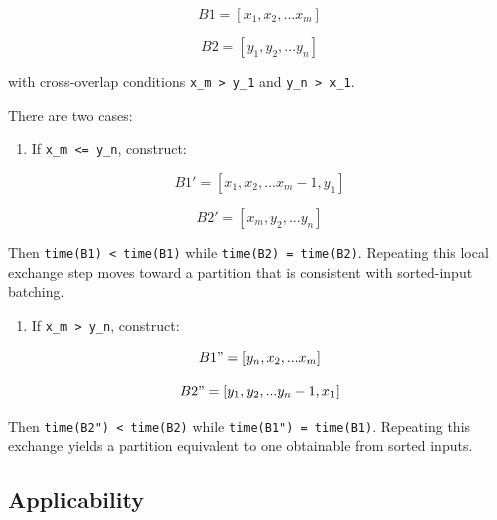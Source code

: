 \documentclass{article}
\providecommand{\tightlist}{\setlength{\itemsep}{0pt}\setlength{\parskip}{0pt}}
\begin{document}
\begin{equation}
B1 = [x_1, x_2, ... x_m]
\end{equation}

\begin{equation}
B2 = [y_1, y_2, ... y_n]
\end{equation}

with cross-overlap conditions \texttt{x\_m\ \textgreater{}\ y\_1} and
\texttt{y\_n\ \textgreater{}\ x\_1}.

There are two cases:

\begin{enumerate}
\def\labelenumi{\arabic{enumi}.}
\tightlist
\item
  If \texttt{x\_m\ \textless{}=\ y\_n}, construct:
\end{enumerate}

\begin{equation}
B1' = [x_1, x_2, ... x_m-1, y_1]
\end{equation}

\begin{equation}
B2' = [x_m, y_2, ... y_n]
\end{equation}

Then \texttt{time(B1\textquotesingle{})\ \textless{}\ time(B1)} while
\texttt{time(B2\textquotesingle{})\ =\ time(B2)}. Repeating this local
exchange step moves toward a partition that is consistent with
sorted-input batching.

\begin{enumerate}
\def\labelenumi{\arabic{enumi}.}
\setcounter{enumi}{1}
\tightlist
\item
  If \texttt{x\_m\ \textgreater{}\ y\_n}, construct:
\end{enumerate}

\begin{equation}
B1" = [y_n, x_2, ... x_m]
\end{equation}

\begin{equation}
B2" = [y_1, y_2, ... y_n-1, x_1]
\end{equation}

Then \texttt{time(B2")\ \textless{}\ time(B2)} while
\texttt{time(B1")\ =\ time(B1)}. Repeating this exchange yields a
partition equivalent to one obtainable from sorted inputs.

\hypertarget{33-applicability}{%
\subsection{Applicability}\label{33-applicability}}
\end{document}
